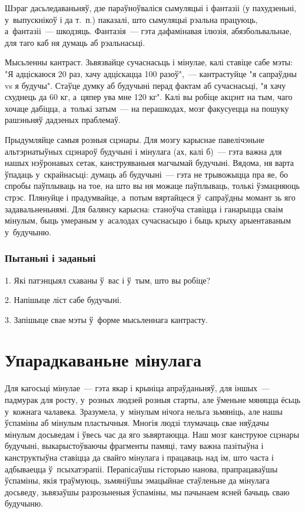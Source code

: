 Шэраг дасьледаваньняў, дзе параўноўваліся сымуляцыі і фантазіі (у пахудзеньні, у~выпускнікоў і да т.~п.) паказалі, што сымуляцыі рэальна працуюць, а~фантазіі~--- шкодзяць. Фантазія~--- гэта дафамінавая ілюзія, абязбольвальнае, для таго каб ня думаць аб рэальнасьці.

Мысьленны кантраст. Зьвязвайце сучаснасьць і мінулае, калі ставіце сабе мэты: "Я адціскаюся 20 раз, хачу адціскацца 100 разоў",~--- кантрастуйце "я сапраўдны vs я будучы". Стаўце думку аб будучыні перад фактам аб сучаснасьці, "я хачу схуднець да 60 кг, а~цяпер ува мне 120 кг". Калі вы робіце акцэнт на тым, чаго хочаце дабіцца, а~толькі затым~--- на перашкодах, мозг факусуецца на пошуку рашэньняў дадзеных праблемаў.

Прыдумляйце самыя розныя сцэнары. Для мозгу карыснае павелічэньне альтэрнатыўных сцэнароў будучыні і мінулага (ах, калі б)~--- гэта важна для нашых нэўронавых сетак, канструяваньня магчымай будучыні. Вядома, ня варта ўпадаць у~скрайнасьці: думаць аб будучыні~--- гэта не трывожыцца пра яе, бо спробы паўплываць на тое, на што вы ня можаце паўплываць, толькі ўзмацняюць стрэс. Плянуйце і прадумвайце, а~потым вяртайцеся ў~сапраўдны момант зь яго задавальненьнямі. Для балянсу карысна: станоўча ставіцца і ганарыцца сваім мінулым, быць умераным у~асалодах сучаснасьцю і быць крыху арыентаваным у~будучыню.

\subsubsection{Пытаньні і заданьні}

1. Які патэнцыял схаваны ў~вас і ў~тым, што вы робіце?

2. Напішыце ліст сабе будучыні.

3. Запішыце свае мэты ў~форме мысьленнага кантрасту.


\section{Упарадкаваньне мінулага}

Для кагосьці мінулае~--- гэта якар і крыніца апраўданьняў, для іншых~--- падмурак для росту, у~розных людзей розныя старты, але ўменьне мяняцца ёсьць у~кожнага чалавека. Зразумела, у~мінулым нічога нельга зьмяніць, але нашы ўспаміны аб мінулым пластычныя. Многія людзі тлумачаць свае няўдачы мінулым досьведам і ўвесь час да яго зьвяртаюцца. Наш мозг канструюе сцэнары будучыні, выкарыстоўваючы фрагменты памяці, таму важна пазітыўна і канструктыўна ставіцца да свайго мінулага і працаваць над ім, што часта і адбываецца ў~псыхатэрапіі. Перапісаўшы гісторыю нанова, прапрацаваўшы ўспаміны, якія траўмуюць, зьмяніўшы эмацыйнае стаўленьне да мінулага досьведу, зьвязаўшы разрозьненыя ўспаміны, мы пачынаем ясней бачыць сваю будучыню.

